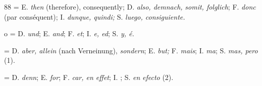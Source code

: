 \begin{VUpage}[92]{88}
 = E. \textit{then} (therefore), consequently; D. \textit{also, demnach,}\nl
\textit{somit, folglich}; F. \textit{donc} (par conséquent); I. \textit{dunque, quindi;}\nl
S. \textit{luego,  consiguiente.}

 o  = D. \textit{und}; E. \textit{and}; F. \textit{et}; I. \textit{e, ed}; S. \textit{y, é.}

 = D. \textit{aber, allein} (nach Verneinung), \textit{sondern}; E. \textit{but;}\nl
F. \textit{mais}; I. \textit{ma}; S. \textit{mas, pero} (1).

 = D. \textit{denn}; E. \textit{for}; F. \textit{car, en effet}; I. \textit{}; S. \textit{en}\nl
\textit{efecto} (2).
\end{VUpage}

